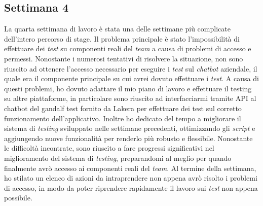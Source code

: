 \subsection{Settimana 4}
La quarta settimana di lavoro è stata una delle settimane più complicate dell'intero percorso di stage. Il problema principale è stato l'impossibilità di effettuare dei \emph{test} su componenti reali del \emph{team} a causa di problemi di accesso e permessi. Nonostante i numerosi tentativi di risolvere la situazione, non sono riuscito ad ottenere l'accesso necessario per eseguire i \emph{test} sul \emph{chatbot} aziendale, il quale era il componente principale su cui avrei dovuto effettuare i \emph{test}. A causa di questi problemi, ho dovuto adattare il mio piano di lavoro e effettuare il testing su altre piattaforme, in particolare sono riuscito ad interfacciarmi tramite API al chatbot del gandalf test fornito da Lakera per effettuare dei test sul corretto funzionamento dell'applicativo. Inoltre ho dedicato del tempo a migliorare il sistema di \emph{testing} sviluppato nelle settimane precedenti, ottimizzando gli \emph{script} e aggiungendo nuove funzionalità per renderlo più robusto e flessibile. Nonostante le difficoltà incontrate, sono riuscito a fare progressi significativi nel miglioramento del sistema di \emph{testing}, preparandomi al meglio per quando finalmente avrò accesso ai componenti reali del \emph{team}. Al termine della settimana, ho stilato un elenco di azioni da intraprendere non appena avrò risolto i problemi di accesso, in modo da poter riprendere rapidamente il lavoro sui \emph{test} non appena possibile.


